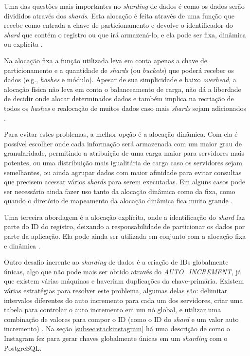 \documentclass[diss]{template/setrem}
\begin{document}
Uma das questões mais importantes no \emph{sharding} de dados é como os dados serão divididos através dos \emph{shards}. Esta alocação é feita através de uma função que recebe como entrada a chave de particionamento e devolve o identificador do \emph{shard} que contém o registro ou que irá armazená-lo, e ela pode ser fixa, dinâmica ou explícita \citep{Schwartz2008}.

Na alocação fixa a função utilizada leva em conta apenas a chave de particionamento e a quantidade de \emph{shards} (ou \emph{buckets}) que poderá receber os dados (e.g., \emph{hashes} e módulo). Apesar de sua simplicidade e baixo \emph{overhead}, a alocação física não leva em conta o balanceamento de carga, não dá a liberdade de decidir onde alocar determinados dados e também implica na recriação de todos os \emph{hashes} e realocação de muitos dados caso mais \emph{shards} sejam adicionados \citep{Schwartz2008}.

Para evitar estes problemas, a melhor opção é a alocação dinâmica. Com ela é possível escolher onde cada informação será armazenada com um maior grau de granularidade, permitindo a atribuição de uma carga maior para servidores mais potentes, ou uma distribuição mais igualitária de carga caso os servidores sejam semelhantes, ou ainda agrupar dados com maior afinidade para evitar consultas que precisem acessar vários \emph{shards} para serem executadas. Em alguns casos pode ser necessário ainda fazer uso tanto da alocação dinâmica como da fixa, como quando o diretório de mapeamento da alocação dinâmica fica muito grande \citep{Schwartz2008}.

Uma terceira abordagem é a alocação explícita, onde a identificação do \emph{shard} faz parte do ID do registro, deixando a responsabilidade de particionar os dados por parte da aplicação. Ela pode ainda ser utilizada em conjunto com a alocação fixa e dinâmica \citep{Schwartz2008}.

Outro desafio inerente ao \emph{sharding} de dados é a criação de IDs globalmente únicas, algo que não pode mais ser obtido através do \emph{AUTO\_INCREMENT}, já que existem várias máquinas e haveriam duplicações da chave-primária. Existem várias estratégias para resolver este problema, algumas delas são: delimitar intervalos diferentes do auto incremento para cada um dos servidores, criar uma tabela para controlar o auto incremento em um nó global, e utilizar uma combinação de valores para compor o ID (como o ID do \emph{shard} e um valor auto incremento) \citep{Schwartz2008}. Na seção \ref{subsec:stackinstagram} há uma descrição de como o Instagram fez para gerar chaves globalmente únicas em um \emph{sharding} com o PostgreSQL.
\end{document}
